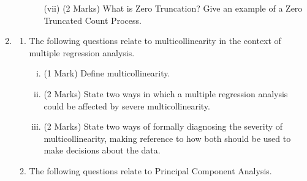 \documentclass[a4paper,12pt]{article}
\begin{document}
\begin{enumerate}
\begin{enumerate}[(a)]
\begin{itemize}
	

	
	
	
	\item[(vii)] (2 Marks) What is Zero Truncation? Give an example of a Zero Truncated Count Process.
\end{itemize}


\end{enumerate}
\bigskip
\item 
\begin{enumerate}

	\item The following questions relate to multicollinearity in the context of multiple
regression analysis.
\begin{enumerate}[(i)]
	\item (1 Mark) Define multicollinearity.
	\item (2 Marks) State two ways in which a multiple regression analysis could be affected by severe
	multicollinearity.
	\item (2 Marks) State two ways of formally diagnosing the severity of multicollinearity, making reference to how both should be used to make decisions about the data.
\end{enumerate}

\bigskip
\item 
The following questions relate to Principal Component Analysis.
\begin{enumerate}[(i)]
	

\end{enumerate}
\end{enumerate}
\end{enumerate}
\end{document}
